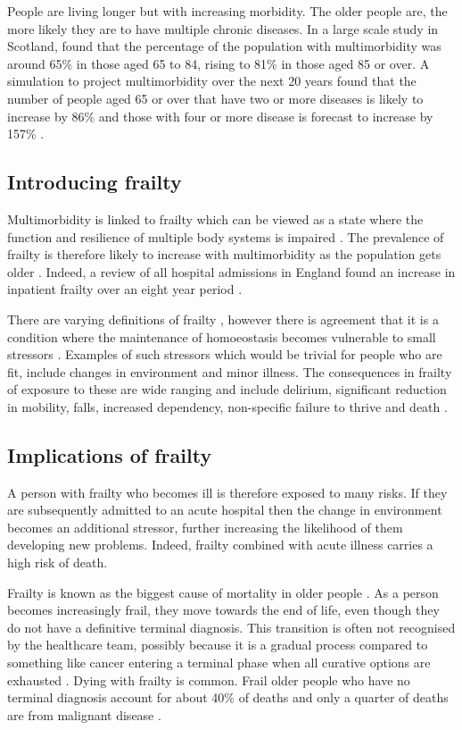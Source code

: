 \documentclass
[
	12pt,
	a4paper,
	oneside,
]{report}
\begin{document}
People are living longer but with increasing morbidity. The older people are, 
the more
likely they are to have multiple chronic diseases. In a large scale study in
Scotland, \textcite{barnett:12} found that the percentage of the population with 
multimorbidity was around 
65\% in those aged 65 to 84, rising to 81\% in those aged 85 or over. A simulation 
to project multimorbidity over the next 20 years found that the number of people
aged 65 or over that have two or more diseases is likely to increase by 86\% and 
those with four or more disease is forecast to increase by 157\%
\parencite{kingston:18}. 

\subsection{Introducing frailty}

Multimorbidity is linked to frailty which can be viewed as a state where 
the function and resilience of multiple body systems is impaired \parencite{woo:14}. 
The prevalence of frailty is therefore likely to increase with multimorbidity 
as the population
gets older \parencite{sharp:13}. Indeed, a review of all hospital admissions in 
England found an increase in inpatient frailty over an eight year period 
\parencite{soong:15}.

There are varying definitions of frailty \parencite{soong:15}, however there is 
agreement that it is a condition where the maintenance of homoeostasis 
becomes vulnerable to small stressors \parencite{vellas:16}. Examples of such 
stressors which would be trivial for people who are fit, include changes in 
environment and minor illness. The consequences in frailty of 
exposure to these are wide ranging and include delirium, significant reduction 
in mobility, falls, increased dependency, non-specific failure to thrive and death 
\parencite{bgs:14,oliver:14,vellas:16}.

\subsection{Implications of frailty}

A person with frailty who becomes ill is therefore exposed to many risks. If
they are subsequently admitted to an acute hospital then the  
change in environment becomes an additional stressor, further increasing the 
likelihood of them developing
new problems. Indeed, frailty combined with acute illness carries a high risk 
of death.

Frailty is known as the biggest cause of mortality in older people 
\parencite{gill:10}. As a person becomes increasingly frail, they move towards 
the end of life, even 
though they do not have a definitive terminal diagnosis. This transition is
often not recognised by the healthcare team, possibly because it is a gradual process
compared to something like cancer entering a terminal phase when all curative
options are exhausted \parencite{oliver:14}. Dying with frailty is common.
Frail older people who have no terminal diagnosis account for about 40\% of 
deaths and only a quarter of deaths are from malignant disease \parencite{sharp:13}.
\end{document}
